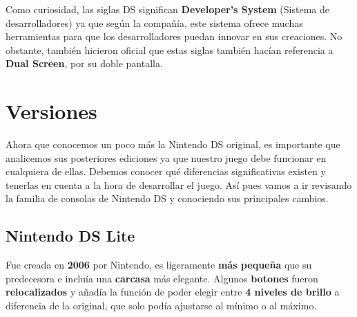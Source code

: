 \vspace{0.5cm}

Como curiosidad, las siglas DS significan \textbf{Developer's System} (Sistema de desarrolladores) ya que según la compañía, este sistema ofrece muchas herramientas para que los desarrolladores puedan innovar en sus creaciones. No obstante, también hicieron oficial que estas siglas también hacían referencia a \textbf{Dual Screen}, por su doble pantalla.

\vspace{1cm}

\section{Versiones}

Ahora que conocemos un poco más la Nintendo DS original, es importante que analicemos sus posteriores ediciones ya que nuestro juego debe funcionar en cualquiera de ellas. Debemos conocer qué diferencias significativas existen y tenerlas en cuenta a la hora de desarrollar el juego. Así pues vamos a ir revisando la familia de consolas de Nintendo DS y conociendo sus principales cambios.

\vspace{1cm}



\subsection{Nintendo DS Lite}

Fue creada en \textbf{2006} por Nintendo, es ligeramente \textbf{más pequeña} que su predecesora e incluía una \textbf{carcasa} más elegante. Algunos \textbf{botones} fueron \textbf{relocalizados} y añadía la función de poder elegir entre \textbf{4 niveles de brillo} a diferencia de la original, que solo podía ajustarse al mínimo o al máximo.

\vspace{0.5cm}

